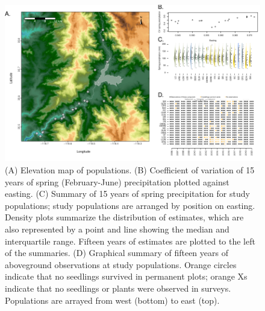 \documentclass[12pt, oneside, titlepage]{article}   	%
\begin{document}
\begin{figure}[htb]
	\includegraphics[width=\textwidth]{../manuscript/figures/intro-figure.pdf}  
        \caption{ \footnotesize (A) Elevation map of populations. (B) Coefficient of variation of 15 years of spring (February-June) precipitation plotted against easting. (C) Summary of 15 years of spring precipitation for study populations; study populations are arranged by position on easting. Density plots summarize the distribution of estimates, which are also represented by a point and line showing the median and interquartile range. Fifteen years of estimates are plotted to the left of the summaries. (D) Graphical summary of fifteen years of aboveground observations at study populations. Orange circles indicate that no seedlings survived in permanent plots; orange Xs indicate that no seedlings or plants were observed in surveys. Populations are arrayed from west (bottom) to east (top). }
        \label{fig:intro-figure}
\end{figure}
\end{document}
